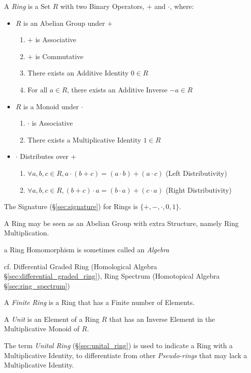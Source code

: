 A \emph{Ring} is a Set $R$ with two Binary Operators, $+$ and $\cdot$, where:
\begin{itemize}
\item $R$ is an Abelian Group under $+$
    \begin{enumerate}
        \item $+$ is Associative
        \item $+$ is Commutative
        \item There exists an Additive Identity $0 \in R$
        \item For all $a \in R$, there exists an Additive Inverse $-a
          \in R$
    \end{enumerate}
\item $R$ is a Monoid under $\cdot$
    \begin{enumerate}
        \item $\cdot$ is Associative
        \item There exists a Multiplicative Identity $1 \in R$
    \end{enumerate}
\item $\cdot$ Distributes over $+$
    \begin{enumerate}
        \item $\forall a,b,c \in R,
            a \cdot (b + c) = (a \cdot b) + (a \cdot c)$
            (Left Distributivity)
        \item $\forall a,b,c \in R,
            (b + c) \cdot a = (b \cdot a) + (c \cdot a)$
            (Right Distributivity)
    \end{enumerate}
\end{itemize}
The Signature (\S\ref{sec:signature}) for Rings is $\{+, -, \cdot, 0, 1\}$.

A Ring may be seen as an Abelian Group with extra Structure, namely Ring
Multiplication.

a Ring Homomorphism is sometimes called an \emph{Algebra}

cf. Differential Graded Ring (Homological Algebra
\S\ref{sec:differential_graded_ring}), Ring Spectrum (Homotopical Algebra
\S\ref{sec:ring_spectrum})

A \emph{Finite Ring} is a Ring that has a Finite number of Elements.

A \emph{Unit} is an Element of a Ring $R$ that has an Inverse
Element in the Multiplicative Monoid of $R$.

The term \emph{Unital Ring} (\S\ref{sec:unital_ring}) is used to
indicate a Ring with a Multiplicative Identity, to differentiate from
other \emph{Pseudo-rings} that may lack a Multiplicative Identity.

